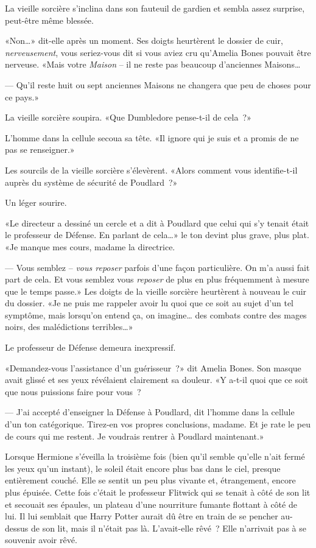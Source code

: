 La vieille sorcière s'inclina dans son fauteuil de gardien et sembla assez surprise, peut-être même blessée.

«Non…» dit-elle après un moment. Ses doigts heurtèrent le dossier de cuir, \emph{nerveusement}, vous seriez-vous dit si vous aviez cru qu'Amelia Bones pouvait être nerveuse. «Mais votre \emph{Maison} -- il ne reste pas beaucoup d'anciennes Maisons…

--- Qu'il reste huit ou sept anciennes Maisons ne changera que peu de choses pour ce pays.»

La vieille sorcière soupira. «Que Dumbledore pense-t-il de cela~?»

L'homme dans la cellule secoua sa tête. «Il ignore qui je suis et a promis de ne pas se renseigner.»

Les sourcils de la vieille sorcière s'élevèrent. «Alors comment vous identifie-t-il auprès du système de sécurité de Poudlard~?»

Un léger sourire.

«Le directeur a dessiné un cercle et a dit à Poudlard que celui qui s'y tenait était le professeur de Défense. En parlant de cela…» le ton devint plus grave, plus plat. «Je manque mes cours, madame la directrice.

--- Vous semblez -- \emph{vous reposer} parfois d'une façon particulière. On m'a aussi fait part de cela. Et vous semblez vous \emph{reposer} de plus en plus fréquemment à mesure que le temps passe.» Les doigts de la vieille sorcière heurtèrent à nouveau le cuir du dossier. «Je ne puis me rappeler avoir lu quoi que ce soit au sujet d'un tel symptôme, mais lorsqu'on entend ça, on imagine… des combats contre des mages noirs, des malédictions terribles…»

Le professeur de Défense demeura inexpressif.

«Demandez-vous l'assistance d'un guérisseur~?» dit Amelia Bones. Son masque avait glissé et ses yeux révélaient clairement sa douleur. «Y a-t-il quoi que ce soit que nous puissions faire pour vous~?

--- J'ai accepté d'enseigner la Défense à Poudlard, dit l'homme dans la cellule d'un ton catégorique. Tirez-en vos propres conclusions, madame. Et je rate le peu de cours qui me restent. Je voudrais rentrer à Poudlard maintenant.»

\later

Lorsque Hermione s'éveilla la troisième fois (bien qu'il semble qu'elle n'ait fermé les yeux qu'un instant), le soleil était encore plus bas dans le ciel, presque entièrement couché. Elle se sentit un peu plus vivante et, étrangement, encore plus épuisée. Cette fois c'était le professeur Flitwick qui se tenait à côté de son lit et secouait ses épaules, un plateau d'une nourriture fumante flottant à côté de lui. Il lui semblait que Harry Potter aurait dû être en train de se pencher au-dessus de son lit, mais il n'était pas là. L'avait-elle rêvé~? Elle n'arrivait pas à se souvenir avoir rêvé.

